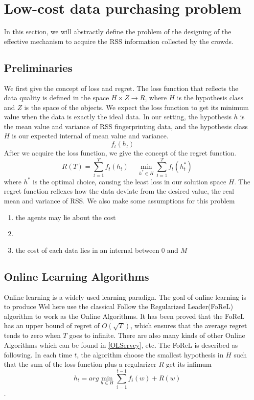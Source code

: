 \documentclass[10pt,conference,compsocconf,letterpaper]{IEEEtran}
\begin{document}
\section{Low-cost data purchasing problem}
In this section, we will abstractly define the problem of the designing of the effective mechanism to acquire the RSS information collected by the crowds. 

\subsection{Preliminaries}
We first give the concept of loss and regret. The loss function that reflects the data quality is defined in the space $H\times Z\to R$, where $H$ is the hypothesis class and $Z$ is the space of the objects. We expect the loss function to get its minimum value when the data is exactly the ideal data. In our setting, the hypothesis $h$ is the mean value and variance of RSS fingerprinting data, and the hypothesis class $H$ is our expected internal of mean value and  variance. 
\begin{equation}
f_t(h_t)=
\end{equation}
 After we acquire the loss function, we give the concept of the regret function.
\begin{equation}
R(T)=\sum_{t=1}^Tf_t(h_t)-\min_{h^*\in H}\sum_{t=1}^Tf_t(h^*_t)
\end{equation}
where $h^*$ is the optimal choice, causing the least loss in our solution space $H$. The regret function reflexes how the data deviate from the desired value, the real mean and variance of RSS. We also make some assumptions for this problem
\begin{enumerate}
\item the agents may lie about the cost
\item 
\item the cost of each data  lies in an internal between  0 and $M$
\end{enumerate}


\subsection{Online Learning Algorithms}
Online learning is a widely used learning paradign. The goal of online learning is to produce 
Wel here use the classical Follow the Regularized Leader(FoReL) algorithm to work as the Online Algorithms. It has been proved that the FoReL has an upper bound of regret of $O(\sqrt{T})$, which ensures that the average regret tends to zero when $T$ goes to infinite. There are also many kinds of other Online Algorithms which can be found in \ref{OLServey}, etc. The FoReL is described as following. In each time $t$, the algorithm choose the smallest hypothesis in $H$ such that the sum of the loss function plus a regularizer $R$ get its infimum
\begin{equation}
h_t=arg\min_{h\in H}\sum_{i=1}^{t-1}f_i(w)+R(w)
\end{equation}.
\end{document}
